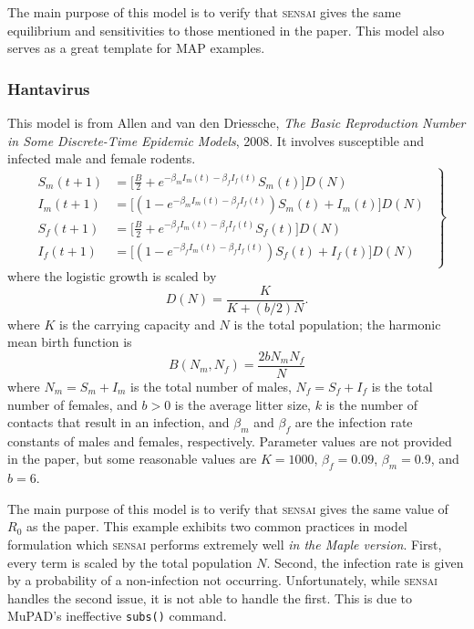 \documentclass[12pt]{article}
\newcommand{\sensai}{\textsc{sensai}}
\begin{document}
The main purpose of this model is to verify that {\sensai} gives the same equilibrium and sensitivities to those mentioned in the paper.  This model also serves as a great template for MAP examples.

\subsubsection{Hantavirus}

This model is from Allen and van den Driessche, \textit{The Basic Reproduction Number in Some Discrete-Time Epidemic Models}, 2008.  It involves susceptible and infected male and female rodents.
%
\begin{equation*}\label{eq:hantavirus}
\left.\begin{gathered}\begin{aligned}
S_m(t+1) &= \Big[ \frac{B}{2}+e^{-\beta_mI_m(t) - \beta_f I_f(t)}S_m(t)\Big]D(N)\\
I_m(t+1) &= \Big[ (1-e^{-\beta_mI_m(t)-\beta_f I_f(t)})S_m(t) + I_m(t)\Big]D(N)\\
S_f(t+1) &= \Big[ \frac{B}{2}+e^{-\beta_f I_m(t)-\beta_f I_f(t)}S_f(t)\Big] D(N)\\
I_f(t+1) &= \Big[ (1-e^{-\beta_f I_m(t)-\beta_f I_f(t)})S_f(t)+I_f(t)\Big]D(N)
\end{aligned}\end{gathered} \right \}
\end{equation*}
%
where the logistic growth is scaled by
%
\begin{equation*}
D(N) = \frac{K}{K+(b/2)N}.
\end{equation*}
%
where $K$ is the carrying capacity and $N$ is the total population; the harmonic mean birth function is
%
\begin{equation*}
B(N_m,N_f) = \frac{2bN_mN_f}{N}
\end{equation*}
%
where $N_m = S_m+I_m$ is the total number of males, $N_f = S_f+I_f$ is the total number of females, and $b>0$ is the average litter size, $k$ is the number of contacts that result in an infection, and $\beta_m$ and $\beta_f$ are the infection rate constants of males and females, respectively.  Parameter values are not provided in the paper, but some reasonable values are $K= 1000$, $\beta_f=0.09$, $\beta_m=0.9$, and $b=6$.

The main purpose of this model is to verify that {\sensai} gives the same value of $R_0$ as the paper.  This example exhibits two common practices in model formulation which {\sensai} performs extremely well \textit{in the Maple version}.  First, every term is scaled by the total population $N$.  Second, the infection rate is given by a probability of a non-infection not occurring.  Unfortunately, while {\sensai} handles the second issue, it is not able to handle the first.  This is due to MuPAD's ineffective {\tt subs()} command.
\end{document}
